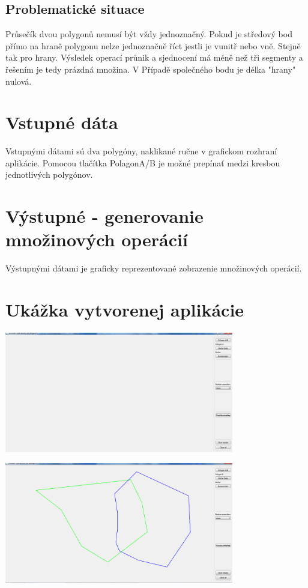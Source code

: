 \documentclass[12pt]{article}
\begin{document}
\subsection{Problematické situace}
Průsečík dvou polygonů nemusí být vždy jednoznačný. Pokud je středový bod přímo na hraně polygonu nelze jednoznačně říct jestli je vunitř nebo vně. Stejně tak pro hrany. Výsledek operací průnik a sjednocení má méně než tři segmenty a řešením je tedy prázdná množina. V Případě společného bodu je délka "hrany" nulová.
\section{Vstupné dáta}
Vstupnými dátami sú dva polygóny, naklikané ručne v grafickom rozhraní aplikácie. Pomocou tlačítka PolagonA/B je možné prepínať medzi kresbou jednotlivých polygónov.

\section{Výstupné - generovanie množinových operácií}
Výstupnými dátami je graficky reprezentované zobrazenie množinových operácií.


\section{Ukážka vytvorenej aplikácie}

\begin{center}
   \includegraphics[width=10cm]{./img/aplikacia1.png}
\end{center}

\begin{center}
   \includegraphics[width=10cm]{./img/aplikacia2.png}
\end{center}
\end{document}
